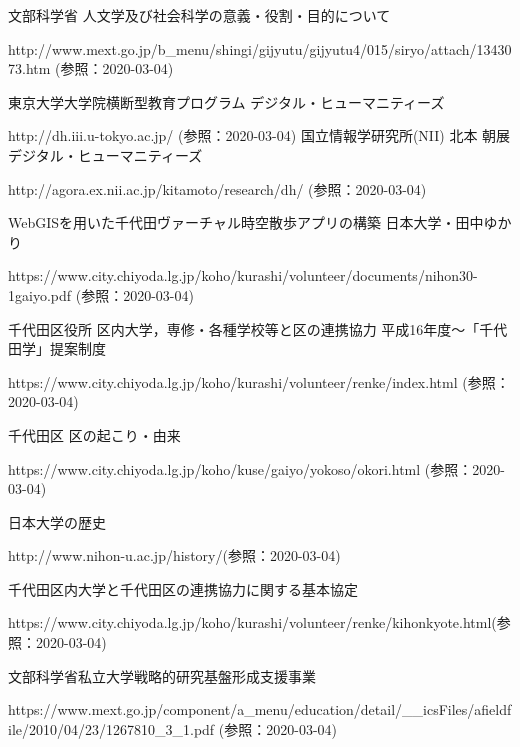 \documentclass[a4paper, twoside]{jarticle}
\begin{document}
\begin{thebibliography}{99}

文部科学省 人文学及び社会科学の意義・役割・目的について\par
http://www.mext.go.jp/b\_menu/shingi/gijyutu/gijyutu4/015/siryo/attach/1343073.htm (参照：2020-03-04)

東京大学大学院横断型教育プログラム デジタル・ヒューマニティーズ\par
http://dh.iii.u-tokyo.ac.jp/ (参照：2020-03-04)
国立情報学研究所(NII) 北本 朝展 デジタル・ヒューマニティーズ\par
http://agora.ex.nii.ac.jp/kitamoto/research/dh/ (参照：2020-03-04)


 WebGISを用いた千代田ヴァーチャル時空散歩アプリの構築 日本大学・田中ゆかり\par
https://www.city.chiyoda.lg.jp/koho/kurashi/volunteer/documents/nihon30-1gaiyo.pdf (参照：2020-03-04)

千代田区役所 区内大学，専修・各種学校等と区の連携協力 平成16年度〜「千代田学」提案制度\par
https://www.city.chiyoda.lg.jp/koho/kurashi/volunteer/renke/index.html (参照：2020-03-04)


千代田区 区の起こり・由来\par
https://www.city.chiyoda.lg.jp/koho/kuse/gaiyo/yokoso/okori.html (参照：2020-03-04)

日本大学の歴史\par
http://www.nihon-u.ac.jp/history/(参照：2020-03-04)

千代田区内大学と千代田区の連携協力に関する基本協定\par
https://www.city.chiyoda.lg.jp/koho/kurashi/volunteer/renke/kihonkyote.html(参照：2020-03-04)

文部科学省私立大学戦略的研究基盤形成支援事業\par
https://www.mext.go.jp/component/a\_menu/education/detail/\_\_icsFiles/afieldfile/2010/04/23/1267810\_3\_1.pdf (参照：2020-03-04)


\end{thebibliography}
\end{document}
